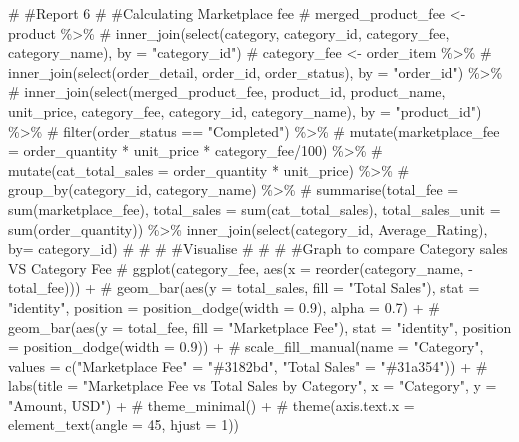\documentclass[
  letterpaper,
  DIV=11,
  numbers=noendperiod]{scrartcl}
\newenvironment{Shaded}{\begin{snugshade}}{\end{snugshade}}
\newcommand{\CommentTok}[1]{\textcolor[rgb]{0.37,0.37,0.37}{#1}}
\begin{document}
\begin{Shaded}
\begin{Highlighting}[]
\CommentTok{\# \#Report 6}
\CommentTok{\# \#Calculating Marketplace fee}
\CommentTok{\# merged\_product\_fee \textless{}{-} product \%\textgreater{}\%}
\CommentTok{\#   inner\_join(select(category, category\_id, category\_fee, category\_name), by = "category\_id")}
\CommentTok{\# category\_fee \textless{}{-} order\_item \%\textgreater{}\%}
\CommentTok{\#   inner\_join(select(order\_detail, order\_id, order\_status), by = "order\_id") \%\textgreater{}\%}
\CommentTok{\#   inner\_join(select(merged\_product\_fee, product\_id, product\_name, unit\_price, category\_fee, category\_id, category\_name), by = "product\_id") \%\textgreater{}\%}
\CommentTok{\#   filter(order\_status == "Completed") \%\textgreater{}\%}
\CommentTok{\#   mutate(marketplace\_fee = order\_quantity * unit\_price * category\_fee/100) \%\textgreater{}\%}
\CommentTok{\#   mutate(cat\_total\_sales = order\_quantity * unit\_price) \%\textgreater{}\%}
\CommentTok{\#   group\_by(category\_id, category\_name) \%\textgreater{}\%}
\CommentTok{\#   summarise(total\_fee = sum(marketplace\_fee), total\_sales = sum(cat\_total\_sales), total\_sales\_unit = sum(order\_quantity)) \%\textgreater{}\% inner\_join(select(category\_id, Average\_Rating), by= \textquotesingle{}category\_id\textquotesingle{})}
\CommentTok{\# }
\CommentTok{\# }
\CommentTok{\# \#Visualise}
\CommentTok{\# }
\CommentTok{\# }
\CommentTok{\# \#Graph to compare Category sales VS Category Fee}
\CommentTok{\# ggplot(category\_fee, aes(x = reorder(category\_name, {-}total\_fee))) +}
\CommentTok{\#   geom\_bar(aes(y = total\_sales, fill = "Total Sales"), stat = "identity", position = position\_dodge(width = 0.9), alpha = 0.7) +}
\CommentTok{\#   geom\_bar(aes(y = total\_fee, fill = "Marketplace Fee"), stat = "identity", position = position\_dodge(width = 0.9)) +}
\CommentTok{\#   scale\_fill\_manual(name = "Category", values = c("Marketplace Fee" = "\#3182bd", "Total Sales" = "\#31a354")) +}
\CommentTok{\#   labs(title = "Marketplace Fee vs Total Sales by Category", x = "Category", y = "Amount, USD") +}
\CommentTok{\#   theme\_minimal() +}
\CommentTok{\#   theme(axis.text.x = element\_text(angle = 45, hjust = 1))}
\end{Highlighting}
\end{Shaded}
\end{document}
